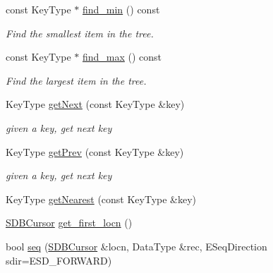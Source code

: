 \begin{CompactItemize}
\item 
const KeyType $\ast$ \hyperlink{classSkipListFile_f754d414aa41d527e0544a5aae83e9a3}{find\_\-min} () const 
\begin{CompactList}\small\item\em Find the smallest item in the tree. \item\end{CompactList}\item 
const KeyType $\ast$ \hyperlink{classSkipListFile_4400eb10cd0d694545abd633cb4fb3cd}{find\_\-max} () const 
\begin{CompactList}\small\item\em Find the largest item in the tree. \item\end{CompactList}\item 
\hypertarget{classSkipListFile_46b7badb6567b5749c16ae70844bf4ad}{
KeyType \hyperlink{classSkipListFile_46b7badb6567b5749c16ae70844bf4ad}{getNext} (const KeyType \&key)}
\label{classSkipListFile_46b7badb6567b5749c16ae70844bf4ad}

\begin{CompactList}\small\item\em given a key, get next key \item\end{CompactList}\item 
\hypertarget{classSkipListFile_fde29489c5295f1f93f5153b26675050}{
KeyType \hyperlink{classSkipListFile_fde29489c5295f1f93f5153b26675050}{getPrev} (const KeyType \&key)}
\label{classSkipListFile_fde29489c5295f1f93f5153b26675050}

\begin{CompactList}\small\item\em given a key, get next key \item\end{CompactList}\item 
KeyType \hyperlink{classSkipListFile_44473481714fc1218112bb1b45550883}{getNearest} (const KeyType \&key)
\item 
\hyperlink{classSkipNode}{SDBCursor} \hyperlink{classSkipListFile_e1d5f4ce7d23b2f22768ed2b5e4efc78}{get\_\-first\_\-locn} ()
\item 
\hypertarget{classSkipListFile_e82b1f10a23fa5f48166002463138d26}{
bool \hyperlink{classSkipListFile_e82b1f10a23fa5f48166002463138d26}{seq} (\hyperlink{classSkipNode}{SDBCursor} \&locn, DataType \&rec, ESeqDirection sdir=ESD\_\-FORWARD)}
\label{classSkipListFile_e82b1f10a23fa5f48166002463138d26}


\end{CompactItemize}
